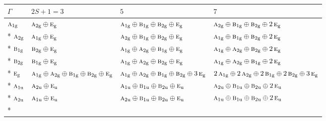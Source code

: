 \documentclass[10pt,a4paper]{article}
\numberwithin{equation}{section}
\newcommand{\irr}[1]{\text{\normalfont\scshape #1}}
\newcommand{\ptag}[1]{\mathrm{#1}}
\begin{document}
{\small\setlength{\tabcolsep}{3pt}\begin{longtable}{@{}llll@{}}\toprule
$\Gamma$ & $2S + 1 = 3$ & $5$ & $7$\\\midrule\endhead
\bottomrule\endfoot\endlastfoot
$\irr{a}_{1\ptag{g}}$ & $\irr{a}_{2\ptag{g}}\oplus \irr{e}_{\ptag{g}}$ & $\irr{a}_{1\ptag{g}}\oplus \irr{b}_{1\ptag{g}}\oplus \irr{b}_{2\ptag{g}}\oplus \irr{e}_{\ptag{g}}$ & $\irr{a}_{2\ptag{g}}\oplus \irr{b}_{1\ptag{g}}\oplus \irr{b}_{2\ptag{g}}\oplus 2\,\irr{e}_{\ptag{g}}$\\*
$\irr{a}_{2\ptag{g}}$ & $\irr{a}_{1\ptag{g}}\oplus \irr{e}_{\ptag{g}}$ & $\irr{a}_{2\ptag{g}}\oplus \irr{b}_{1\ptag{g}}\oplus \irr{b}_{2\ptag{g}}\oplus \irr{e}_{\ptag{g}}$ & $\irr{a}_{1\ptag{g}}\oplus \irr{b}_{1\ptag{g}}\oplus \irr{b}_{2\ptag{g}}\oplus 2\,\irr{e}_{\ptag{g}}$\\*
$\irr{b}_{1\ptag{g}}$ & $\irr{b}_{2\ptag{g}}\oplus \irr{e}_{\ptag{g}}$ & $\irr{a}_{1\ptag{g}}\oplus \irr{a}_{2\ptag{g}}\oplus \irr{b}_{1\ptag{g}}\oplus \irr{e}_{\ptag{g}}$ & $\irr{a}_{1\ptag{g}}\oplus \irr{a}_{2\ptag{g}}\oplus \irr{b}_{2\ptag{g}}\oplus 2\,\irr{e}_{\ptag{g}}$\\*
$\irr{b}_{2\ptag{g}}$ & $\irr{b}_{1\ptag{g}}\oplus \irr{e}_{\ptag{g}}$ & $\irr{a}_{1\ptag{g}}\oplus \irr{a}_{2\ptag{g}}\oplus \irr{b}_{2\ptag{g}}\oplus \irr{e}_{\ptag{g}}$ & $\irr{a}_{1\ptag{g}}\oplus \irr{a}_{2\ptag{g}}\oplus \irr{b}_{1\ptag{g}}\oplus 2\,\irr{e}_{\ptag{g}}$\\*
$\irr{e}_{\ptag{g}}$ & $\irr{a}_{1\ptag{g}}\oplus \irr{a}_{2\ptag{g}}\oplus \irr{b}_{1\ptag{g}}\oplus \irr{b}_{2\ptag{g}}\oplus \irr{e}_{\ptag{g}}$ & $\irr{a}_{1\ptag{g}}\oplus \irr{a}_{2\ptag{g}}\oplus \irr{b}_{1\ptag{g}}\oplus \irr{b}_{2\ptag{g}}\oplus 3\,\irr{e}_{\ptag{g}}$ & $2\,\irr{a}_{1\ptag{g}}\oplus 2\,\irr{a}_{2\ptag{g}}\oplus 2\,\irr{b}_{1\ptag{g}}\oplus 2\,\irr{b}_{2\ptag{g}}\oplus 3\,\irr{e}_{\ptag{g}}$\\*
$\irr{a}_{1\ptag{u}}$ & $\irr{a}_{2\ptag{u}}\oplus \irr{e}_{\ptag{u}}$ & $\irr{a}_{1\ptag{u}}\oplus \irr{b}_{1\ptag{u}}\oplus \irr{b}_{2\ptag{u}}\oplus \irr{e}_{\ptag{u}}$ & $\irr{a}_{2\ptag{u}}\oplus \irr{b}_{1\ptag{u}}\oplus \irr{b}_{2\ptag{u}}\oplus 2\,\irr{e}_{\ptag{u}}$\\*
$\irr{a}_{2\ptag{u}}$ & $\irr{a}_{1\ptag{u}}\oplus \irr{e}_{\ptag{u}}$ & $\irr{a}_{2\ptag{u}}\oplus \irr{b}_{1\ptag{u}}\oplus \irr{b}_{2\ptag{u}}\oplus \irr{e}_{\ptag{u}}$ & $\irr{a}_{1\ptag{u}}\oplus \irr{b}_{1\ptag{u}}\oplus \irr{b}_{2\ptag{u}}\oplus 2\,\irr{e}_{\ptag{u}}$\\*

\end{longtable}}
\end{document}
